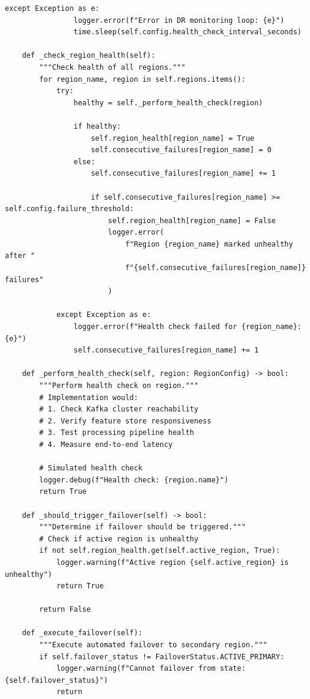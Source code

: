 \begin{lstlisting}[style=python, caption={Disaster Recovery Manager}]
            except Exception as e:
                logger.error(f"Error in DR monitoring loop: {e}")
                time.sleep(self.config.health_check_interval_seconds)

    def _check_region_health(self):
        """Check health of all regions."""
        for region_name, region in self.regions.items():
            try:
                healthy = self._perform_health_check(region)

                if healthy:
                    self.region_health[region_name] = True
                    self.consecutive_failures[region_name] = 0
                else:
                    self.consecutive_failures[region_name] += 1

                    if self.consecutive_failures[region_name] >= self.config.failure_threshold:
                        self.region_health[region_name] = False
                        logger.error(
                            f"Region {region_name} marked unhealthy after "
                            f"{self.consecutive_failures[region_name]} failures"
                        )

            except Exception as e:
                logger.error(f"Health check failed for {region_name}: {e}")
                self.consecutive_failures[region_name] += 1

    def _perform_health_check(self, region: RegionConfig) -> bool:
        """Perform health check on region."""
        # Implementation would:
        # 1. Check Kafka cluster reachability
        # 2. Verify feature store responsiveness
        # 3. Test processing pipeline health
        # 4. Measure end-to-end latency

        # Simulated health check
        logger.debug(f"Health check: {region.name}")
        return True

    def _should_trigger_failover(self) -> bool:
        """Determine if failover should be triggered."""
        # Check if active region is unhealthy
        if not self.region_health.get(self.active_region, True):
            logger.warning(f"Active region {self.active_region} is unhealthy")
            return True

        return False

    def _execute_failover(self):
        """Execute automated failover to secondary region."""
        if self.failover_status != FailoverStatus.ACTIVE_PRIMARY:
            logger.warning(f"Cannot failover from state: {self.failover_status}")
            return


\end{lstlisting}
